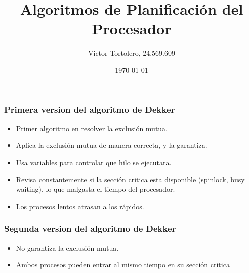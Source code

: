 \documentclass{beamer}
\title{Algoritmos de Planificación del Procesador}
\author{Victor Tortolero, 24.569.609}
\institute{
	Sistemas Operativos, FACYT
}
\date{\today}
\begin{document}

\begin{frame}
	\titlepage

\end{frame}
\author{ }


\begin{frame}
\frametitle{Primera version del algoritmo de Dekker}

\begin{itemize}
	\item Primer algoritmo en resolver la exclusión mutua.
	\item Aplica la exclusión mutua de manera correcta, y la garantiza.
	\item Usa variables para controlar que hilo se ejecutara.
	\item Revisa constantemente si la sección critica esta disponible (spinlock, busy waiting),
	lo que malgasta el tiempo del procesador.
	\item Los procesos lentos atrasan a los rápidos.
\end{itemize}
\end{frame}


\begin{frame}
	\frametitle{Segunda version del algoritmo de Dekker}
	
	\begin{itemize}		
		\item No garantiza la exclusión mutua.
		\item Ambos procesos pueden entrar al mismo tiempo en su sección critica
	\end{itemize}
\end{frame}

\end{document}
